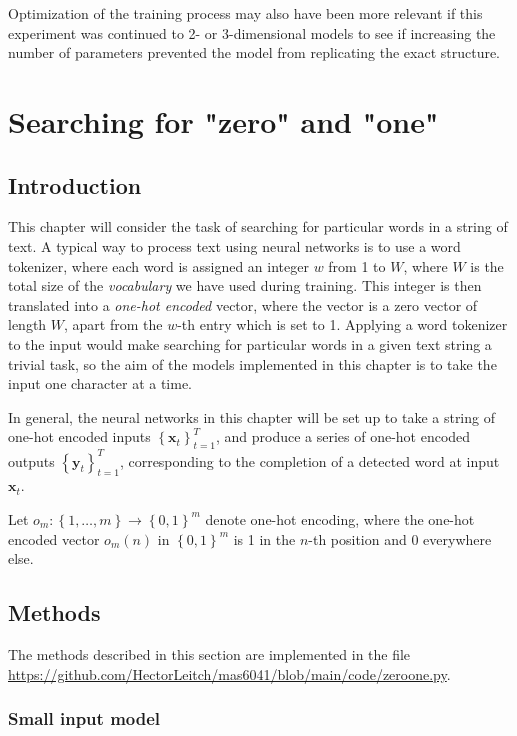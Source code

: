 \documentclass{somasmsc}
\begin{document}
Optimization of the training process may also have been more relevant if this experiment was continued to 2- or 3-dimensional models to see if increasing the number of parameters prevented the model from replicating the exact structure.

\chapter{Searching for "zero" and "one"}

\section{Introduction}

This chapter will consider the task of searching for particular words in a string of text. A typical way to process text using neural networks is to use a word tokenizer, where each word is assigned an integer $w$ from 1 to $W$, where $W$ is the total size of the \textit{vocabulary} we have used during training. This integer is then translated into a \textit{one-hot encoded} vector, where the vector is a zero vector of length $W$, apart from the $w$-th entry which is set to 1. Applying a word tokenizer to the input would make searching for particular words in a given text string a trivial task, so the aim of the models implemented in this chapter is to take the input one character at a time.

In general, the neural networks in this chapter will be set up to take a string of one-hot encoded inputs $\left\{\pmb{x}_t\right\}_{t=1}^T$, and produce a series of one-hot encoded outputs $\left\{\pmb{y}_t\right\}_{t=1}^T$, corresponding to the completion of a detected word at input $\pmb{x}_t$.

Let $o_m: \left\{1, \dots, m\right\} \rightarrow \left\{0, 1\right\}^m$ denote one-hot encoding, where the one-hot encoded vector $o_m\left(n\right)$ in $\left\{0,1\right\}^m$ is 1 in the $n$-th position and 0 everywhere else.

\section{Methods}

The methods described in this section are implemented in the file \url{https://github.com/HectorLeitch/mas6041/blob/main/code/zeroone.py}.

\subsection{Small input model}\label{zeroone:small}
\end{document}
